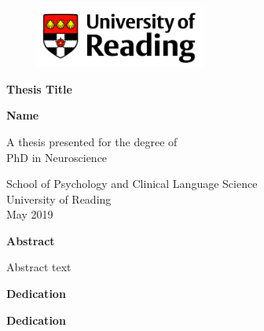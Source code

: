 \documentclass[11pt,oneside]{report} %
\begin{document}

\begin{figure}[t]
\includegraphics[width=0.5\textwidth]{reading_logo.png} %
\centering
\end{figure}

\begin{titlepage}
\begin{center}
  \vspace*{1cm}
 
   \Large
   \textbf{Thesis Title}
   
   \vspace{1.5 cm}
   \textbf{Name}
   
   \vspace{3 cm} %
    A thesis presented for the degree of\\
    PhD in Neuroscience
  
   \vspace{2 cm} %
   \Large
   School of Psychology and Clinical Language Science\\
   University of Reading\\
   May 2019
\end{center}
\end{titlepage}


\newpage
\thispagestyle{plain}
\begin{center}
    \Huge
    \textbf{Abstract}
    
    \vspace{1cm}
    \large
    Abstract text 
\end{center}
 
\newpage
\thispagestyle{plain}
\begin{center}
    \Huge
    \textbf{Dedication}  
    
    \vspace{1cm}
    \Large
    \textbf{Dedication}
\end{center}
 
\end{document}
